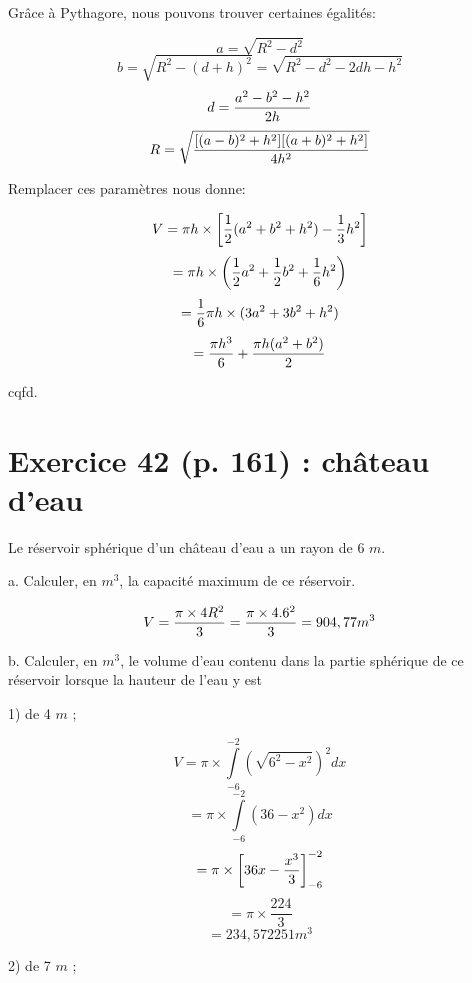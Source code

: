 \documentclass[10pt]{article}
\begin{document}
Grâce à Pythagore, nous pouvons trouver certaines égalités:

$$a=\sqrt{R^2-d^2}$$
$$b=\sqrt{R^2-(d+h)^2} = \sqrt{R^2-d^2-2dh-h^2}$$
$$d={a^2-b^2-h^2\over{2h}}$$
$$R= \sqrt{{[(a-b)^2+h^2][(a+b)^2+h^2]\over{4h^2}}}$$\vspace{0.1cm}

Remplacer ces paramètres nous donne:

$$V = \pi h \times \left[{1\over{2}}(a^2+b^2+h^2)-{1\over{3}}h^2 \right]$$
$$= \pi h \times \left( {1\over{2}}a^2 + {1\over{2}}b^2 + {1\over{6}}h^2 \right)$$
$$={1\over{6}} \pi h \times (3a^2 + 3b^2 + h^2 )$$
$$={\pi h^3\over{6}} + {\pi h (a^2+b^2)\over{2}}$$

\begin{center}
cqfd.
\end{center}

\section*{Exercice 42 (p. 161) : château d'eau}\vspace{0.2cm}

\flushleft Le réservoir sphérique d'un château d'eau a un rayon de 6 $m$.\vspace{0.1cm}

a. Calculer, en $m^3$, la capacité maximum de ce réservoir.

$$V = {\pi \times 4R^2\over{3}} = {\pi \times 4.6^2\over{3}} = 904,77 m^3$$\vspace{0.1cm}

b. Calculer, en $m^3$, le volume d'eau contenu dans la partie sphérique de ce réservoir lorsque la hauteur de l'eau y est

\hspace{1cm}1) de 4 $m$ ;

$$V=\pi \times \int\limits_{-6}^{-2} \left( \sqrt{6^2-x^2} \right)^2dx$$
$$=\pi \times \int\limits_{-6}^{-2} (36-x^2)dx$$
$$=\pi \times \left[ 36x-{x^3\over{3}} \right]_{-6}^{-2}$$
$$=\pi \times \frac{224}{3}$$
$$=234,572251 m^3$$

\newpage

\hspace{1cm}2) de 7 $m$ ;
\end{document}
